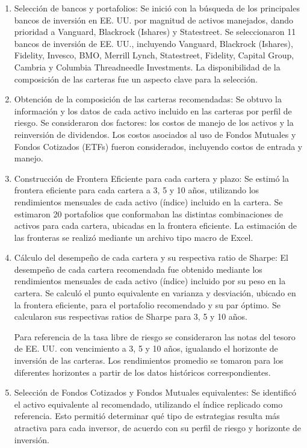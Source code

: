 \documentclass[a4paper,fleqn]{cas-sc}
\begin{document}
\begin{enumerate}[1.]
    \item Selección de bancos y portafolios: Se inició con la búsqueda de los principales bancos de inversión en EE. UU. por magnitud de activos manejados, dando prioridad a Vanguard, Blackrock (Ishares) y Statestreet. Se seleccionaron 11 bancos de inversión de EE. UU., incluyendo Vanguard, Blackrock (Ishares), Fidelity, Invesco, BMO, Merrill Lynch, Statestreet, Fidelity, Capital Group, Cambria y Columbia Threadneedle Investments. La disponibilidad de la composición de las carteras fue un aspecto clave para la selección.

    \item Obtención de la composición de las carteras recomendadas: Se obtuvo la información y los datos de cada activo incluido en las carteras por perfil de riesgo. Se consideraron dos factores: los costos de manejo de los activos y la reinversión de dividendos. Los costos asociados al uso de Fondos Mutuales y Fondos Cotizados (ETFs) fueron considerados, incluyendo costos de entrada y manejo.

    \item Construcción de Frontera Eficiente para cada cartera y plazo: Se estimó la frontera eficiente para cada cartera a 3, 5 y 10 años, utilizando los rendimientos mensuales de cada activo (índice) incluido en la cartera. Se estimaron 20 portafolios que conformaban las distintas combinaciones de activos para cada cartera, ubicadas en la frontera eficiente. La estimación de las fronteras se realizó mediante un archivo tipo macro de Excel.

    \item Cálculo del desempeño de cada cartera y su respectiva ratio de Sharpe: El desempeño de cada cartera recomendada fue obtenido mediante los rendimientos mensuales de cada activo (índice) incluido por su peso en la cartera. Se calculó el punto equivalente en varianza y desviación, ubicado en la frontera eficiente, para el portafolio recomendado y su par óptimo. Se calcularon sus respectivas ratios de Sharpe para 3, 5 y 10 años.

    Para referencia de la tasa libre de riesgo se consideraron las notas del tesoro de EE. UU. con vencimiento a 3, 5 y 10 años, igualando el horizonte de inversión de las carteras. Los rendimientos promedio se tomaron para los diferentes horizontes a partir de los datos históricos correspondientes.

    \item Selección de Fondos Cotizados y Fondos Mutuales equivalentes: Se identificó el activo equivalente al recomendado, utilizando el índice replicado como referencia. Esto permitió determinar qué tipo de estrategias resulta más atractiva para cada inversor, de acuerdo con su perfil de riesgo y horizonte de inversión.


\end{enumerate}
\end{document}
